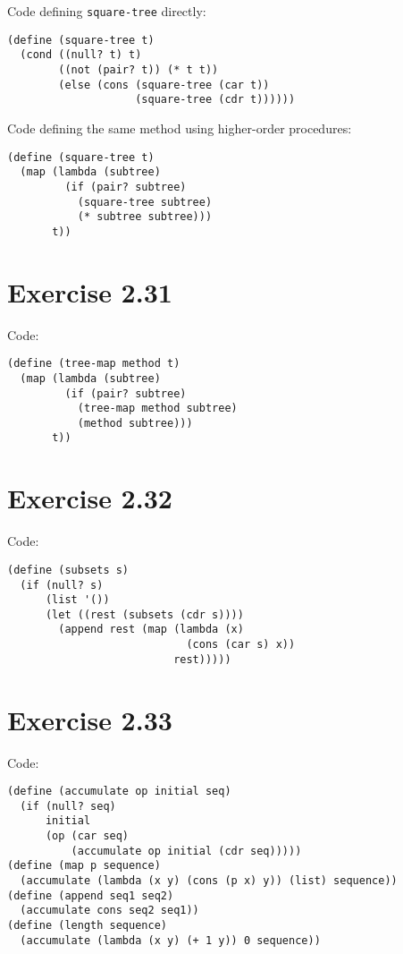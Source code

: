 \documentclass[../main.tex]{subfiles}
\begin{document}
Code defining \lstinline{square-tree} directly:

\begin{lstlisting}
(define (square-tree t)
  (cond ((null? t) t)
        ((not (pair? t)) (* t t))
        (else (cons (square-tree (car t))
                    (square-tree (cdr t))))))
\end{lstlisting}

Code defining the same method using higher-order
 procedures:
 
\begin{lstlisting}
(define (square-tree t)
  (map (lambda (subtree)
         (if (pair? subtree)
           (square-tree subtree)
           (* subtree subtree)))
       t))
\end{lstlisting}

\section{Exercise 2.31}

Code:

\begin{lstlisting}
(define (tree-map method t)
  (map (lambda (subtree)
         (if (pair? subtree)
           (tree-map method subtree)
           (method subtree)))
       t))
\end{lstlisting}

\section{Exercise 2.32}

Code:

\begin{lstlisting}
(define (subsets s)
  (if (null? s)
      (list '())
      (let ((rest (subsets (cdr s))))
        (append rest (map (lambda (x)
                            (cons (car s) x))
                          rest)))))
\end{lstlisting}

\section{Exercise 2.33}

Code:

\begin{lstlisting}
(define (accumulate op initial seq)
  (if (null? seq)
      initial
      (op (car seq)
          (accumulate op initial (cdr seq)))))
(define (map p sequence)
  (accumulate (lambda (x y) (cons (p x) y)) (list) sequence))
(define (append seq1 seq2)
  (accumulate cons seq2 seq1))
(define (length sequence)
  (accumulate (lambda (x y) (+ 1 y)) 0 sequence))
\end{lstlisting}
\end{document}
